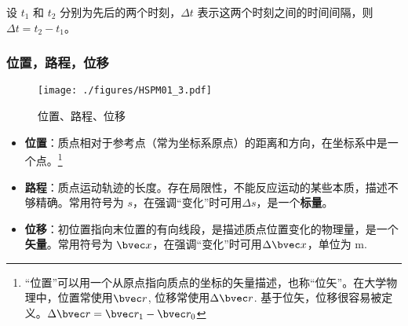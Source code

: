 设 $t_1$ 和 $t_2$ 分别为先后的两个时刻，$\Delta t$ 表示这两个时刻之间的时间间隔，则 $\Delta t = t_2 - t_1$。

\subsubsection{位置，路程，位移}
\begin{figure}[ht]
\centering
\texttt{[image: ./figures/HSPM01\_3.pdf]}
\caption{位置、路程、位移} \label{HSPM01_fig3}
\end{figure}
\begin{itemize}
\item \textbf{位置}：质点相对于参考点（常为坐标系原点）的距离和方向，在坐标系中是一个点。\footnote{“位置”可以用一个从原点指向质点的坐标的矢量描述，也称“位矢”。在大学物理中，位置常使用$\bvec r$, 位移常使用$\Delta \bvec r$. 基于位矢，位移很容易被定义。$\Delta \bvec r = \bvec r_1 - \bvec r_0$}
\item \textbf{路程}：质点运动轨迹的长度。存在局限性，不能反应运动的某些本质，描述不够精确。常用符号为 $s$，在强调“变化”时可用$\Delta s$，是一个\textbf{标量}。
\item \textbf{位移}：初位置指向末位置的有向线段，是描述质点位置变化的物理量，是一个\textbf{矢量}。常用符号为 $\bvec x$，在强调“变化”时可用$\Delta \bvec x$，单位为 $\mathrm{m}$.
\end{itemize}

